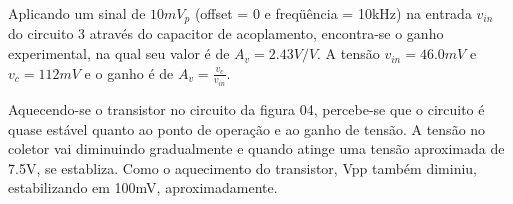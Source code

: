 \documentclass[a4paper]{article} %
\begin{document}
Aplicando um sinal de $10mV_p$ (offset = 0 e freqüência = 10kHz) na entrada $v_{in}$
do circuito 3 através do capacitor de acoplamento, encontra-se o ganho experimental, na qual seu
valor é de $A_v=2.43V/V$. A tensão  $v_{in}=46.0mV$ e  $v_c=112mV$ e o ganho é de $A_v=\frac{v_c}{v_{in}}$.

Aquecendo-se o transistor no circuito da figura 04, percebe-se que o circuito é quase
estável quanto ao ponto de operação e ao ganho de tensão. A tensão no coletor vai
diminuindo gradualmente e quando atinge uma tensão aproximada de 7.5V,
se establiza.
Como o aquecimento do transistor, Vpp também diminiu, estabilizando em 100mV,
aproximadamente.











\end{document}
